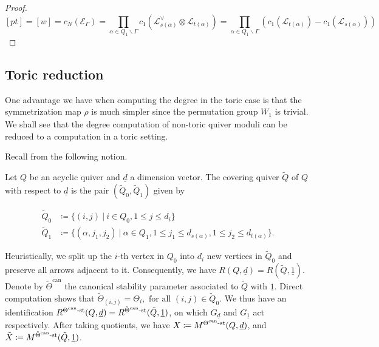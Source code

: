 \documentclass[11pt]{article}
\begin{document}
\begin{proof}
    \[
    [pt] = [w] = c_N(\mathcal{E}_{\Gamma}) = \prod_{\alpha\in Q_1\backslash \Gamma}c_1(\mathcal{L}_{s(\alpha)}^{\vee}\otimes \mathcal{L}_{t(\alpha)}) = \prod_{\alpha\in Q_1\backslash \Gamma}(c_1(\mathcal{L}_{t(\alpha)}) - c_1(\mathcal{L}_{s(\alpha)}))
    \]
\end{proof}

\subsection{Toric reduction}

One advantage we have when computing the degree in the toric case is that the symmetrization map \(\rho\) is much simpler since the permutation group \(W_{\underline{1}}\) is trivial. We shall see that the degree computation of non-toric quiver moduli can be reduced to a computation in a toric setting. 

Recall from \cite[Section 4.2]{franzen2015chow} the following notion.

\begin{definition}
    Let \(Q\) be an acyclic quiver and \(\underline{d}\) a dimension vector. The covering quiver \(\tilde{Q}\) of \(Q\) with respect to \(\underline{d}\) is the pair \((\tilde{Q}_0, \tilde{Q}_1)\) given by

    \begin{align*}
        \tilde{Q}_0 &\coloneqq \{(i, j)~|~i\in Q_0, 1\leq j\leq d_i\}\\ 
        \tilde{Q}_1 &\coloneqq \{(\alpha, j_1, j_2)~|~\alpha\in Q_1, 1\leq j_1\leq d_{s(\alpha)}, 1\leq j_2\leq d_{t(\alpha)}\}.
    \end{align*}
\end{definition}

Heuristically, we split up the \(i\)-th vertex in \(Q_0\) into \(d_i\) new vertices in \(\tilde{Q}_0\) and preserve all arrows adjacent to it. Consequently, we have \(R(Q, \underline{d}) = R(\tilde{Q}, \underline{1})\). Denote by \(\tilde{\Theta}^{\text{can}}\) the canonical stability parameter associated to \(\tilde{Q}\) with \(\underline{1}\). Direct computation shows that \(\tilde{\Theta}_{(i, j)} = \Theta_i, \text{ for all } (i, j)\in \tilde{Q}_0\). We thus have an identification \(R^{\Theta^{\text{can}}\text{-st}}(Q, \underline{d}) = R^{\tilde{\Theta}^{\text{can}}\text{-st}}(\tilde{Q}, \underline{1})\), on which \(G_{\underline{d}}\) and \(G_{\underline{1}}\) act respectively. After taking quotients, we have \(X\coloneqq M^{\Theta^{\text{can}}\text{-st}}(Q, \underline{d})\), and \(\tilde{X}\coloneqq M^{\tilde{\Theta}^{\text{can}}\text{-st}}(\tilde{Q}, \underline{1})\). 
\end{document}
